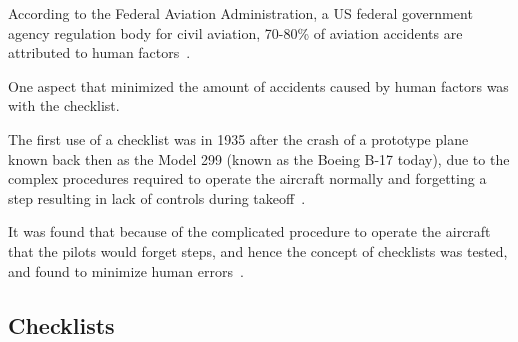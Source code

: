 \documentclass[../dissertation.tex]{subfiles}
\begin{document}
According to the Federal Aviation Administration, a US federal government agency regulation
body for civil aviation, 70-80\% of aviation accidents are attributed to human factors~\cite{faa:reasons}.

One aspect that minimized the amount of accidents caused by human factors was with the checklist.

The first use of a checklist was in 1935 after the crash of a prototype plane known
back then as the Model 299 (known as the Boeing B-17 today), due to the complex procedures
required to operate the aircraft normally and forgetting a step resulting in
lack of controls during takeoff~\cite{manifesto}.

It was found that because of the complicated procedure to operate the aircraft
that the pilots would forget steps, and hence the concept of checklists was tested,
and found to minimize human errors~\cite{manifesto}.


\subsection{Checklists}


  

  
\end{document}
